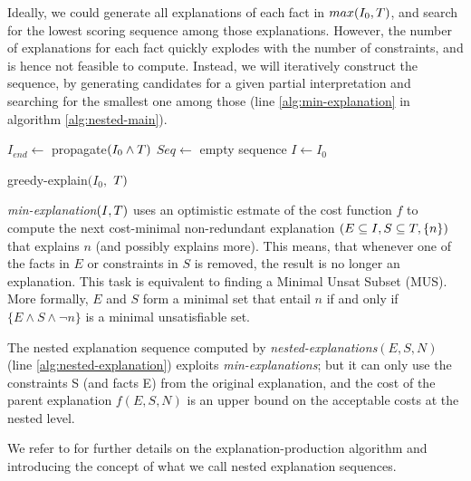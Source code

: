 Ideally, we could generate all explanations of each fact in $max(I_0,T)$, and search for the lowest scoring sequence among those explanations.
However, the number of explanations for each fact quickly explodes with the number of constraints, and is hence not feasible to compute.
Instead, we will iteratively construct the sequence, by generating candidates for a given partial interpretation and searching for the smallest one among those (line \ref{alg:min-explanation} in algorithm \ref{alg:nested-main}).

\begin{algorithm}[ht]
  $I_{end} \gets$ propagate$(I_0\land T)$\;
  $Seq \gets$ empty sequence\;
  $I \gets I_0$\;
  \caption{greedy-explain$(I_0,$ $T)$}
  \label{alg:nested-main}
\end{algorithm}
\textit{min-explanation$(I,T)$} uses an optimistic estmate of the cost function $f$ to compute the next cost-minimal non-redundant explanation $(E \subseteq I, S \subseteq T,\{n\})$ that explains $n$ (and possibly explains more).
This means, that whenever one of the facts in $E$ or constraints in $S$ is removed, the result is no longer an explanation.
This task is equivalent to finding a Minimal Unsat Subset (MUS).
More formally, $E$ and $S$ form a minimal set that entail $n$ if and only if  $\{E \land S \land \lnot n\}$ is a minimal unsatisfiable set.

The nested explanation sequence computed by \textit{nested-explanations$(E,S, N)$} (line \ref{alg:nested-explanation}) exploits \textit{min-explanations}; but it can only use the constraints S (and facts E) from the original explanation, and the cost of the parent explanation $f(E,S,N)$ is an upper bound on the acceptable costs at the nested level.

We refer to \cite{ecai/BogaertsGCG20} for further details on the explanation-production algorithm and \cite{bogaerts2020framework} introducing the concept of what we call nested explanation sequences.

